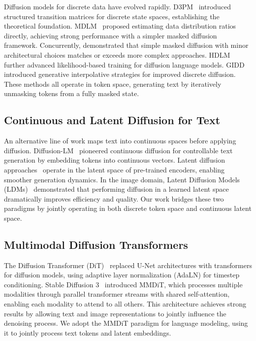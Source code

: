 \documentclass{article}
\begin{document}
Diffusion models for discrete data have evolved rapidly. D3PM~\citep{austin2021d3pm} introduced structured transition matrices for discrete state spaces, establishing the theoretical foundation. MDLM~\citep{lou2024mdlm} proposed estimating data distribution ratios directly, achieving strong performance with a simpler masked diffusion framework. Concurrently, \citet{sahoo2024simple} demonstrated that simple masked diffusion with minor architectural choices matches or exceeds more complex approaches. HDLM~\citep{gulrajani2024hdlm} further advanced likelihood-based training for diffusion language models. GIDD~\citep{ruette2024gidd} introduced generative interpolative strategies for improved discrete diffusion. These methods all operate in token space, generating text by iteratively unmasking tokens from a fully masked state.

\subsection{Continuous and Latent Diffusion for Text}

An alternative line of work maps text into continuous spaces before applying diffusion. Diffusion-LM~\citep{li2022diffusionlm} pioneered continuous diffusion for controllable text generation by embedding tokens into continuous vectors. Latent diffusion approaches~\citep{lovelace2024latent} operate in the latent space of pre-trained encoders, enabling smoother generation dynamics. In the image domain, Latent Diffusion Models (LDMs)~\citep{rombach2022ldm} demonstrated that performing diffusion in a learned latent space dramatically improves efficiency and quality. Our work bridges these two paradigms by jointly operating in both discrete token space and continuous latent space.

\subsection{Multimodal Diffusion Transformers}

The Diffusion Transformer (DiT)~\citep{peebles2023dit} replaced U-Net architectures with transformers for diffusion models, using adaptive layer normalization (AdaLN) for timestep conditioning. Stable Diffusion 3~\citep{esser2024sd3} introduced MMDiT, which processes multiple modalities through parallel transformer streams with shared self-attention, enabling each modality to attend to all others. This architecture achieves strong results by allowing text and image representations to jointly influence the denoising process. We adopt the MMDiT paradigm for language modeling, using it to jointly process text tokens and latent embeddings.
\end{document}
